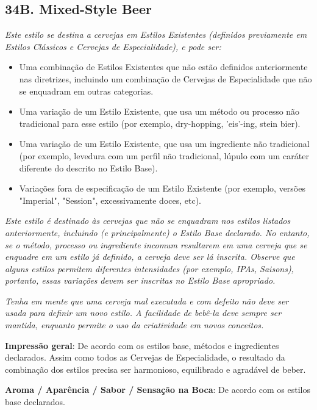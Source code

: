 \subsection*{34B. Mixed-Style Beer}

\textit{Este estilo se destina a cervejas em Estilos Existentes (definidos previamente em Estilos Clássicos e Cervejas de Especialidade), e pode ser:}

\begin{itemize}
\item Uma combinação de Estilos Existentes que não estão definidos anteriormente nas diretrizes, incluindo um combinação de Cervejas de Especialidade que não se enquadram em outras categorias.
\item Uma variação de um Estilo Existente, que usa um método ou processo não tradicional para esse estilo (por exemplo, dry-hopping, 'eis'-ing, stein bier).
\item Uma variação de um Estilo Existente, que usa um ingrediente não tradicional (por exemplo, levedura com um perfil não tradicional, lúpulo com um caráter diferente do descrito no Estilo Base).
\item Variações fora de especificação de um Estilo Existente (por exemplo, versões "Imperial", "Session", excessivamente doces, etc).
\end{itemize}

\textit{Este estilo é destinado às cervejas que não se enquadram nos estilos listados anteriormente, incluindo (e principalmente) o Estilo Base declarado. No entanto, se o método, processo ou ingrediente incomum resultarem em uma cerveja que se enquadre em um estilo já definido, a cerveja deve ser lá inscrita. Observe que alguns estilos permitem diferentes intensidades (por exemplo, IPAs, Saisons), portanto, essas variações devem ser inscritas no Estilo Base apropriado.}

\textit{Tenha em mente que uma cerveja mal executada e com defeito não deve ser usada para definir um novo estilo. A facilidade de bebê-la deve sempre ser mantida, enquanto permite o uso da criatividade em novos conceitos.}

\textbf{Impressão geral}: De acordo com os estilos base, métodos e ingredientes declarados. Assim como todos as Cervejas de Especialidade, o resultado da combinação dos estilos precisa ser harmonioso, equilibrado e agradável de beber.

\textbf{Aroma / Aparência / Sabor / Sensação na Boca}: De acordo com os estilos base declarados.

